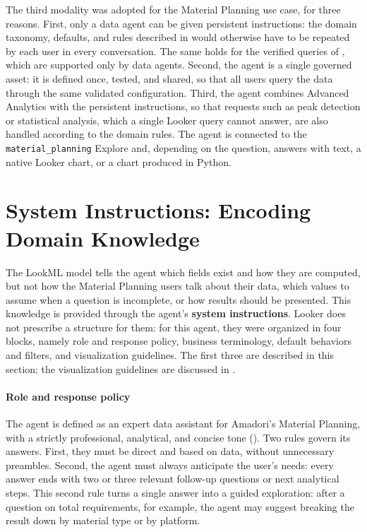 The third modality was adopted for the Material Planning use case, for three reasons. First, only a data agent can be given persistent instructions: the domain taxonomy, defaults, and rules described in  would otherwise have to be repeated by each user in every conversation. The same holds for the verified queries of , which are supported only by data agents. Second, the agent is a single governed asset: it is defined once, tested, and shared, so that all users query the data through the same validated configuration. Third, the agent combines Advanced Analytics with the persistent instructions, so that requests such as peak detection or statistical analysis, which a single Looker query cannot answer, are also handled according to the domain rules. The agent is connected to the \texttt{material\_planning} Explore and, depending on the question, answers with text, a native Looker chart, or a chart produced in Python.

\section{System Instructions: Encoding Domain Knowledge}
\label{sec:system_instructions}

The LookML model tells the agent which fields exist and how they are computed, but not how the Material Planning users talk about their data, which values to assume when a question is incomplete, or how results should be presented. This knowledge is provided through the agent's \textbf{system instructions}. Looker does not prescribe a structure for them: for this agent, they were organized in four blocks, namely role and response policy, business terminology, default behaviors and filters, and visualization guidelines. The first three are described in this section; the visualization guidelines are discussed in .

\paragraph{Role and response policy}
The agent is defined as an expert data assistant for Amadori's Material Planning, with a strictly professional, analytical, and concise tone (). Two rules govern its answers. First, they must be direct and based on data, without unnecessary preambles. Second, the agent must always anticipate the user's needs: every answer ends with two or three relevant follow-up questions or next analytical steps. This second rule turns a single answer into a guided exploration: after a question on total requirements, for example, the agent may suggest breaking the result down by material type or by platform.

